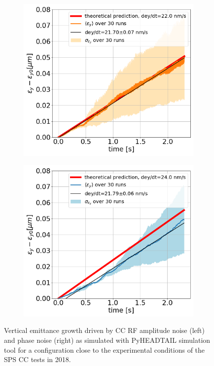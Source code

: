 \begin{figure}[htp]
    \centering
    \begin{subfigure}{.45\textwidth}
        \centering
        \includegraphics[width=.95\linewidth]{images/Ch6/pyheadtail_benchmark_amplitude_noise.png}  
    \end{subfigure}
    \begin{subfigure}{.45\textwidth}
        \centering
        \includegraphics[width=.95\linewidth]{images/Ch6/pyheadtail_benchmark_phase_noise.png}
    \end{subfigure}
    \caption{Vertical emittance growth driven by CC RF amplitude noise (left) and phase noise (right) as simulated with PyHEADTAIL simulation tool for a configuration close to the experimental conditions of the SPS CC tests in 2018.}
    \label{fig:study_pyheadtail_normalised_momentum_kicks}
\end{figure}

